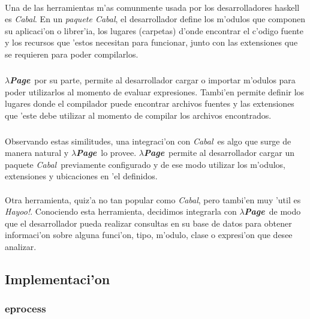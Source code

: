 \documentclass[a4paper]{article}
\newcommand{\hpage}{\textbf{\textsl{$\lambda$Page}}}
\newcommand{\cabal}{\textsl{Cabal}}
\begin{document}
\paragraph{}Una de las herramientas m'as comunmente usada por los desarrolladores haskell es \cabal.  En un \textsl{paquete Cabal}, el desarrollador define los m'odulos que componen su aplicaci'on o librer'ia, los lugares (carpetas) d'onde encontrar el c'odigo fuente y los recursos que 'estos necesitan para funcionar, junto con las extensiones que se requieren para poder compilarlos.
\subparagraph{}\hpage\ por su parte, permite al desarrollador cargar o importar m'odulos para poder utilizarlos al momento de evaluar expresiones.  Tambi'en permite definir los lugares donde el compilador puede encontrar archivos fuentes y las extensiones que 'este debe utilizar al momento de compilar los archivos encontrados.
\subparagraph{}Observando estas similitudes, una integraci'on con \cabal\ es algo que surge de manera natural y \hpage\ lo provee.  \hpage\ permite al desarrollador cargar un paquete \cabal\ previamente configurado y de ese modo utilizar los m'odulos, extensiones y ubicaciones en 'el definidos.
\paragraph{}Otra herramienta, quiz'a no tan popular como \cabal, pero tambi'en muy 'util es \textsl{Hayoo!}.  Conociendo esta herramienta, decidimos integrarla con \hpage\ de modo que el desarrollador pueda realizar consultas en su base de datos para obtener informaci'on sobre alguna funci'on, tipo, m'odulo, clase o expresi'on que desee analizar.

\newpage
\subsection{Implementaci'on}\label{secImplement}
\begin{epigraphs}
\end{epigraphs}

\subsubsection{eprocess}\label{secEprocess}
\end{document}
